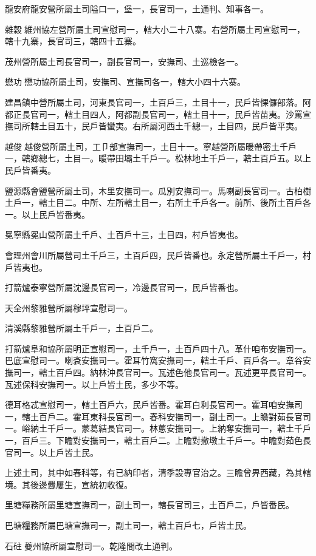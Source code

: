 \begin{pinyinscope}
龍安府龍安營所屬土司隘口一，堡一，長官司一，土通判、知事各一。

雜穀維州協左營所屬土司宣慰司一，轄大小二十八寨。右營所屬土司宣慰司一，轄十九寨，長官司三，轄四十五寨。

茂州營所屬土司長官司一，副長官司一，安撫司、土巡檢各一。

懋功懋功協所屬土司，安撫司、宣撫司各一，轄大小四十六寨。

建昌鎮中營所屬土司，河東長官司一，土百戶三，土目十一，民戶皆惈儸部落。阿都正長官司一，轄土目四人，阿都副長官司一，轄土目十一，民戶皆苗夷。沙罵宣撫司所轄土目五十，民戶皆蠻夷。右所屬河西土千總一，土目四，民戶皆平夷。

越俊越俊營所屬土司，工⼙部宣撫司一，土目十一。寧越營所屬暖帶密土千戶一，轄鄉總七，土目一。暖帶田壩土千戶一。松林地土千戶一，轄土百戶五。以上民戶皆番夷。

鹽源縣會鹽營所屬土司，木里安撫司一。瓜別安撫司一。馬喇副長官司一。古柏樹土戶一，轄土目二。中所、左所轄土目一，右所土千戶各一。前所、後所土百戶各一。以上民戶皆番夷。

冕寧縣冕山營所屬土千戶、土百戶十三，土目四，村戶皆夷也。

會理州會川所屬營司土千戶三，土百戶四，民戶皆番也。永定營所屬土千戶一，村戶皆夷也。

打箭爐泰寧營所屬沈邊長官司一，冷邊長官司一，民戶皆番也。

天全州黎雅營所屬穆坪宣慰司一。

清溪縣黎雅營所屬土千戶一，土百戶二。

打箭爐阜和協所屬明正宣慰司一，土千戶一，土百戶四十八。革什咱布安撫司一。巴底宣慰司一。喇袞安撫司一。霍耳竹窩安撫司一，轄土千戶、百戶各一。章谷安撫司一，轄土百戶四。納林沖長官司一。瓦述色他長官司一。瓦述更平長官司一。瓦述保科安撫司一。以上戶皆土民，多少不等。

德耳格忒宣慰司一，轄土百戶六，民戶皆番。霍耳白利長官司一。霍耳咱安撫司一，轄土百戶二。霍耳東科長官司一。春科安撫司一，副土司一。上瞻對茹長官司一。峪納土千戶一。蒙葛結長官司一。林蔥安撫司一。上納奪安撫司一，轄土千戶一，百戶三。下瞻對安撫司一，轄土百戶二。上瞻對撤墩土千戶一。中瞻對茹色長官司一。以上戶皆土民。

上述土司，其中如春科等，有已納印者，清季設專官治之。三瞻曾畀西藏，為其轄境。其後邊釁屢生，宣統初收復。

里塘糧務所屬里塘宣撫司一，副土司一，轄長官司三，土百戶二，戶皆番民。

巴塘糧務所屬巴塘宣撫司一，副土司一，轄土百戶七，戶皆土民。

石砫夔州協所屬宣慰司一。乾隆間改土通判。


\end{pinyinscope}
